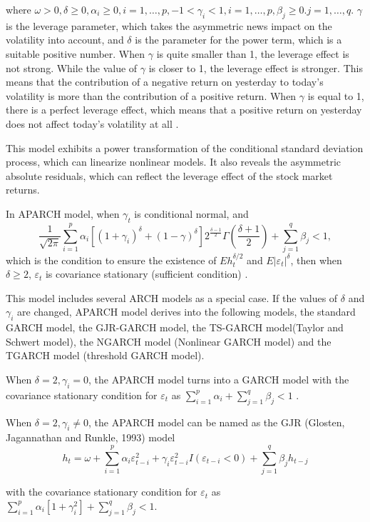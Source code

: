 where $\omega>0, \delta\geq0, \alpha_{i}\geq0, i=1, \ldots, p, -1<\gamma_{i}<1, i=1, \ldots, p, \beta_{j}\geq0.j=1, \ldots, q$. $\gamma$ is the leverage parameter, which takes the asymmetric news impact on the volatility into account,  and $\delta$ is the parameter for the power term, which is a suitable positive number. When $\gamma$ is quite smaller than 1, the leverage effect is not strong. While the value of $\gamma$  is closer to 1, the leverage effect is stronger. This means that the contribution of a negative return on yesterday to today's volatility is more than the contribution of a positive return. When $\gamma$ is equal to 1, there is a perfect leverage effect, which means that a positive return on yesterday does not affect today's volatility at all \citep{FengYuanhua;Sun2013}.

This model exhibits a power transformation of the conditional standard deviation process, which can linearize nonlinear models. It also reveals the asymmetric absolute residuals, which can reflect the leverage effect of the stock market returns.


In APARCH model, when $\gamma_{t}$ is conditional normal, and \[\frac{1}{\sqrt{2\pi}}\sum_{i=1}^{p}\alpha_{i} [\left(1 + \gamma_{i} \right)^\delta + (1-\gamma)^{\delta}]2^{\frac{\delta-1}{2}}\Gamma (\frac{\delta+1}{2}) + \sum_{j=1}^{q}\beta_{j}<1,\]
which is the condition to ensure the existence of $Eh_{t}^{\delta/2}$ and $E|\varepsilon_{t}|^{\delta}$, then when $\delta\geq2$, $\varepsilon_t$   is covariance stationary (sufficient condition) \citep{Ding1993}.


This model includes several ARCH models as a special case. If the values of $\delta$ and $\gamma_{i}$ are changed, APARCH model derives into the following models, the standard GARCH model, the GJR-GARCH model, the TS-GARCH model(Taylor and Schwert model), the NGARCH model (Nonlinear GARCH model) and the TGARCH model (threshold GARCH model).

When $\delta=2,\gamma_{i}=0$, the APARCH model turns into a GARCH model with the covariance stationary condition for  $\varepsilon_{t}$ as $\sum_{i=1}^{p}\alpha_{i} + \sum_{j=1}^{q}\beta_{j}<1$ \citep{Bollerslev1986}.

When $\delta = 2, \gamma_{i}\neq 0$, the APARCH model can be named as the GJR (Glosten, Jagannathan and Runkle, 1993) model 
\[h_{t}=\omega + \sum_{i=1}^{p}\alpha_{i}\varepsilon_{t-i}^{2}+\gamma_{i}\varepsilon_{t-i}^{2}I(\varepsilon_{t-i}<0)+\sum_{j=1}^{q}\beta
_{j}h_{t-j}\]

with the  covariance stationary condition for $\varepsilon_{t}$ as $\sum_{i=1}^{p}\alpha_{i}[1+\gamma_{i}^{2}]+\sum_{j=1}^{q}\beta_{j}<1$.

